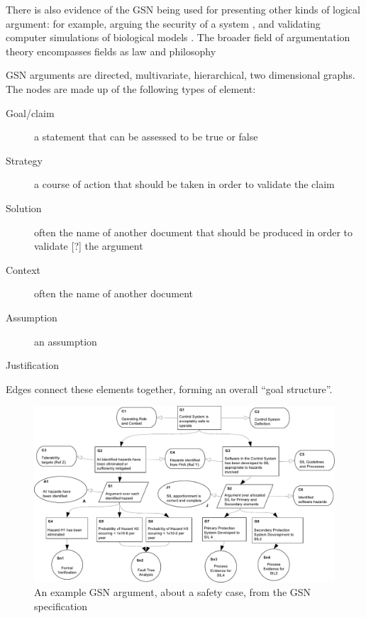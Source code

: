 There is also evidence of the GSN being used for presenting other kinds of logical argument:
for example,
arguing the security of a system \cite{plop},
and validating computer simulations of biological models \cite{insilico}\cite{royal}.
The broader field of argumentation theory encompasses fields \such as law and philosophy 

GSN arguments are directed, multivariate, hierarchical, two dimensional graphs.
The nodes are made up of the following types of element:

\begin{description}

  \item[ Goal/claim ]
    a statement that can be assessed to be true or false

  \item[ Strategy]
    a course of action that should be taken in order to validate the claim
  
  \item[ Solution]
      often the name of another document that should be produced in order to validate [?] the argument 

  \item[ Context]
    often the name of another document

  \item[ Assumption]
    an assumption

  \item[ Justification]

\end{description}

Edges connect these elements together, forming an overall ``goal structure''. 

\begin{figure}
  \centering
  \includegraphics[width=\textwidth]{example_argument.pdf}
  \caption{An example GSN argument, about a safety case,
    from the GSN specification \cite{gsnstandard}}
  \label{fig:crampedex1}
\end{figure}




